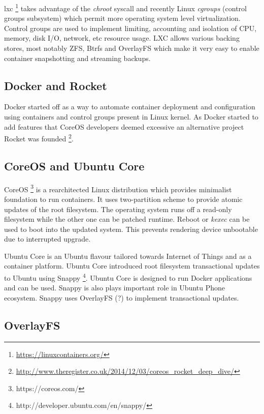 \documentclass[a4paper,11pt]{kth-mag}
\begin{document}
\cite{chris-mason-the-btrfs-filesystem}



\gls{lxc}
\footnote{\url{https://linuxcontainers.org/}}
takes advantage of the \emph{chroot} syscall and
recently Linux \emph{cgroups} (control groups subsystem) which permit
more  operating system level virtualization.
Control groups are used to implement limiting, accounting
and isolation of CPU, memory, disk I/O, network, etc resource usage.
LXC allows various backing stores, most notably ZFS, Btrfs and
OverlayFS which make it very easy to enable container
snapshotting and streaming backups.

\subsection{Docker and Rocket}

Docker started off as a way to automate container deployment and
configuration using containers and control groups present in Linux
kernel. As Docker started to add features that CoreOS developers
deemed excessive an alternative project Rocket was founded
\footnote{\url{http://www.theregister.co.uk/2014/12/03/coreos_rocket_deep_dive/}}.

\subsection{CoreOS and Ubuntu Core}

CoreOS \footnote{https://coreos.com/} is a rearchitected Linux
distribution which provides minimalist foundation to run containers.
It uses two-partition scheme to provide atomic updates of the root
filesystem. The operating system runs off a read-only filesystem
while the other one can be patched runtime. Reboot or \emph{kexec}
can be used to boot into the updated system. This prevents rendering
device unbootable due to interrupted upgrade.

Ubuntu Core is an Ubuntu flavour tailored towards Internet of Things
and as a container platform. Ubuntu Core introduced root filesystem
transactional updates to Ubuntu using Snappy
\footnote{http://developer.ubuntu.com/en/snappy/}.
Ubuntu Core is designed to run Docker applications and can be used.
Snappy is also plays important role in Ubuntu Phone ecosystem.
Snappy uses OverlayFS (?) to implement transactional updates.


\subsection{OverlayFS}
\end{document}
